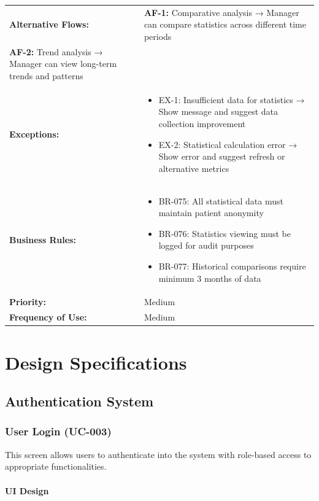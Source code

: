 \documentclass[12pt,a4paper]{article}
\begin{document}
\begin{longtable}{|p{4.5cm}|p{10.5cm}|}
\hline
\textbf{Alternative Flows:} &
\textbf{AF-1:} Comparative analysis → Manager can compare statistics across different time periods \\
\textbf{AF-2:} Trend analysis → Manager can view long-term trends and patterns \\
\hline
\textbf{Exceptions:} &
\begin{itemize}
  \item EX-1: Insufficient data for statistics → Show message and suggest data collection improvement
  \item EX-2: Statistical calculation error → Show error and suggest refresh or alternative metrics
\end{itemize} \\
\hline
\textbf{Business Rules:} &
\begin{itemize}
  \item BR-075: All statistical data must maintain patient anonymity
  \item BR-076: Statistics viewing must be logged for audit purposes
  \item BR-077: Historical comparisons require minimum 3 months of data
\end{itemize} \\
\hline
\textbf{Priority:} & Medium \\
\hline
\textbf{Frequency of Use:} & Medium \\
\hline
\end{longtable}

\newpage

\section{Design Specifications}

\subsection{Authentication System}

\subsubsection{User Login (UC-003)}

This screen allows users to authenticate into the system with role-based access to appropriate functionalities.

\paragraph{UI Design}
\end{document}

